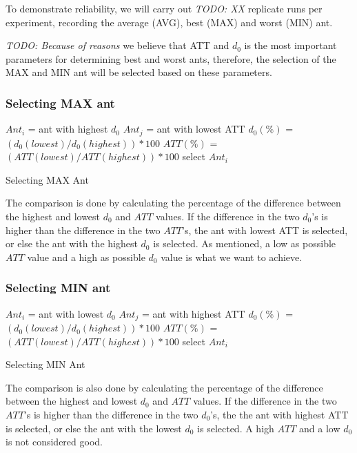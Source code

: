To demonstrate reliability, we will carry out \emph{\color{blue} TODO: XX } replicate runs per experiment, recording the average (AVG), best (MAX) and worst (MIN) ant.  

\emph{\color{blue} TODO: Because of reasons }we believe that ATT and $d_0$ is the most important parameters for determining best and worst ants, therefore, the selection of the MAX and MIN ant will be selected based on these parameters. 

\subsubsection{Selecting MAX ant}
\begin{algorithm}[H]
$Ant_{i}$ = ant with highest $d_0$\;
$Ant_{j}$ = ant with lowest ATT\;
{
	$d_0(\%)$ = $(d_0(lowest) / d_0(highest))*100$\;
	$ATT(\%)$ = $(ATT(lowest) / ATT(highest))*100$\;
	{
		select $Ant_{i}$
	}
}
 \caption{Selecting MAX Ant}
\end{algorithm}


The comparison is done by calculating the percentage of the difference between the highest and lowest $d_0$ and $ATT$ values. If the difference in the two $d_0$'s is higher than the difference in the two $ATT$'s, the ant with lowest ATT is selected, or else the ant with the highest $d_0$ is selected. As mentioned, a low as possible $ATT$ value and a high as possible $d_0$ value is what we want to achieve.

\subsubsection{Selecting MIN ant}
\begin{algorithm}[H]
$Ant_{i}$ = ant with lowest $d_0$\;
$Ant_{j}$ = ant with highest ATT\;
{
	$d_0(\%)$ = $(d_0(lowest) / d_0(highest))*100$\;
	$ATT(\%)$ = $(ATT(lowest) / ATT(highest))*100$\;
	{
		select $Ant_{i}$
	}
}
 \caption{Selecting MIN Ant}

\end{algorithm}

The comparison is also done by calculating the percentage of the difference between the highest and lowest $d_0$ and $ATT$ values. If the difference in the two $ATT$'s is higher than the difference in the two $d_0$'s, the the ant with highest ATT is selected, or else the ant with the lowest $d_0$ is selected. A high $ATT$ and a low $d_0$ is not considered good. 


